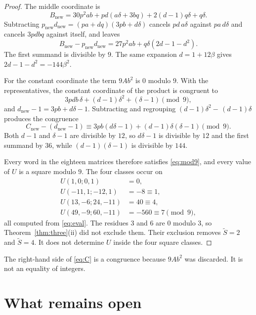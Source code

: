 \documentclass[11pt]{article}
\theoremstyle{remark}
\newcommand{\tS}{\widetilde{S}}
\begin{document}
\begin{proof}
The middle coordinate is
\[
B_{\mathrm{new}}=30p^2 ab+pd(a\delta+3bq)+2(d-1)q\delta+q\delta.
\]
Subtracting \(p_{\mathrm{new}}d_{\mathrm{new}}=(pa+dq)(3pb+d\delta)\) cancels \(pd\,a\delta\) against \(pa\,d\delta\) and cancels \(3pdbq\) against itself, and leaves
\[
B_{\mathrm{new}}-p_{\mathrm{new}}d_{\mathrm{new}}=27p^2 ab+q\delta(2d-1-d^2).
\]
The first summand is divisible by \(9\).
The same expansion \(d=1+12\beta\) gives \(2d-1-d^2=-144\beta^2\).

For the constant coordinate the term \(9Ab^2\) is \(0\) modulo \(9\).
With the representatives, the constant coordinate of the product is congruent to
\[
3pdb\,\delta+(d-1)\delta^2+(\delta-1)\pmod{9},
\]
and \(d_{\mathrm{new}}-1=3pb+d\delta-1\).
Subtracting and regrouping \((d-1)\delta^2-\,(d-1)\delta\) produces the congruence
\begin{equation}
\label{eq:C}
C_{\mathrm{new}}-(d_{\mathrm{new}}-1)\equiv 3pb(d\delta-1)+(d-1)\delta(\delta-1)\pmod{9}.
\end{equation}
Both \(d-1\) and \(\delta-1\) are divisible by \(12\), so \(d\delta-1\) is divisible by \(12\) and the first summand by \(36\), while \((d-1)(\delta-1)\) is divisible by \(144\).

Every word in the eighteen matrices therefore satisfies \eqref{eq:mod9}, and every value of \(U\) is a square modulo \(9\).
The four classes occur on
\begin{align*}
U(1,0;0,1)&=0,\\
U(-11,1;-12,1)&=-8\equiv 1,\\
U(13,-6;24,-11)&=40\equiv 4,\\
U(49,-9;60,-11)&=-560\equiv 7\pmod{9},
\end{align*}
all computed from \eqref{eq:eval}.
The residues \(3\) and \(6\) are \(0\) modulo \(3\), so Theorem~\ref{thm:three}(ii) did not exclude them.
Their exclusion removes \(\tS=2\) and \(\tS=4\).
It does not determine \(U\) inside the four square classes.
\end{proof}

The right-hand side of \eqref{eq:C} is a congruence because \(9Ab^2\) was discarded.
It is not an equality of integers.

\section{What remains open}
\label{sec:open}
\end{document}
